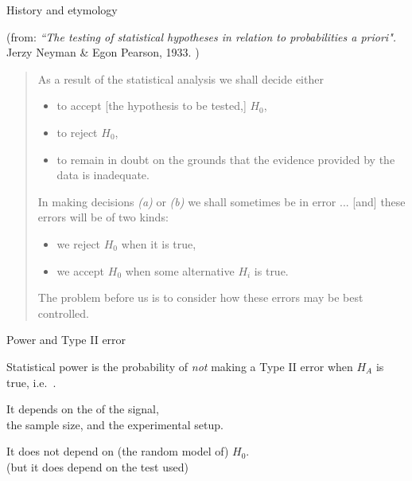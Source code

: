 \begin{frame}{History and etymology}

  (from: \textit{``The testing of statistical hypotheses in relation to probabilities a priori".} Jerzy Neyman \& Egon Pearson, 1933. )

    \vspace{2em}

  \begin{quote}
    As a result of the statistical analysis we shall decide either
    \begin{itemize}
        \item[(a)] to accept [the hypothesis to be tested,] $H_0$, 
        \item[(b)] to reject $H_0$, 
        \item[(c)] to remain in doubt 
          on the grounds that the evidence provided by the data is inadequate.
    \end{itemize}
    In making decisions \textit{(a)} or \textit{(b)}
    we shall sometimes be in error
    ... [and] these errors will be of two kinds:
    \begin{itemize}
      \item[(I)] we reject $H_0$ when it is true,
      \item[(II)] we accept $H_0$ when some alternative $H_i$ is true.
    \end{itemize}
    The problem before us is to consider how these errors may be best controlled.
  \end{quote}


\end{frame}

\begin{frame}{Power and Type II error}

    \begin{block}{}
        \alert{Statistical power} is the probability of \emph{not} making a Type II error when $H_A$ is true,
        i.e.\ .
    \end{block}
    

    \vspace{2em}

    It depends on the  of the signal,\\
    the sample size, and the experimental setup.


    \vspace{2em}

    It does \alert{not} depend on (the random model of) $H_0$.\\
    (but it does depend on the test used)

\end{frame}


